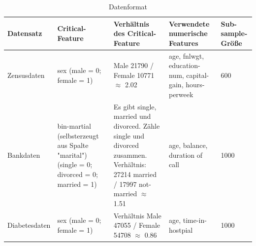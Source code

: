         \begin{table}[htbp]
            \centering
            \caption{Datenformat}
            \begin{tabular}{|>{\raggedright}p{2.4cm}||>{\raggedright}p{3.5cm}|>{\raggedright}p{3.9cm}|>{\raggedright}p{3cm}|p{1.4cm}|} %
                \toprule %
                Datensatz & Critical-Feature & Verhältnis des Critical-Feature & Verwendete numerische Features & Sub-sample-Größe\\
                \hline
                \hline
                Zensusdaten \cite{misc_adult_2} & sex (male = 0; female = 1) & Male 21790 / Female 10771 $\approx$ 2.02 & age, fnlwgt, education-num, capital-gain, hours-perweek & 600 \\
                \hline
                Bankdaten \cite{misc_bank_marketing_222} & bin-martial (selbsterzeugt aus Spalte "marital") (single = 0; divorced = 0; married = 1) & Es gibt single, married und divorced. Zähle single und divorced zusammen. Verhältnis: 27214 married / 17997 not-married $\approx$ 1.51 & age, balance, duration of call & 1000\\
                \hline
                Diabetesdaten \cite{misc_diabetes_130_richtig} & sex (male = 0; female = 1) & Verhältnis Male 47055 / Female 54708 $\approx$ 0.86 & age, time-in-hostpial & 1000 \\
                \hline
            \end{tabular}
            \label{tab:dataset_table}
        \end{table}
        